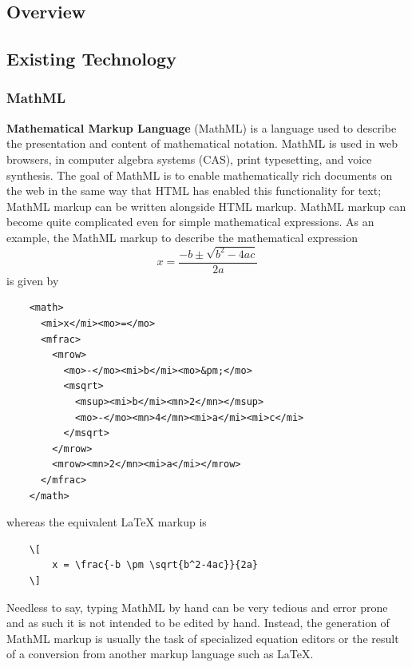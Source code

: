 \documentclass[11pt]{article}
\begin{document}
\subsection{Overview}

\subsection{Existing Technology}

\subsubsection{MathML}
\textbf{Mathematical Markup Language} (MathML) is a language used to describe the presentation and content of mathematical notation.  MathML is used in web browsers, in computer algebra systems (CAS), print typesetting, and voice synthesis.  The goal of MathML is to enable mathematically rich documents on the web in the same way that HTML has enabled this functionality for text; MathML markup can be written alongside HTML markup.  MathML markup can become quite complicated even for simple mathematical expressions.  As an example, the MathML markup to describe the mathematical expression
\[
x = \frac{-b \pm\sqrt{b^2-4ac}}{2a}
\]
is given by
\begin{verbatim}
    <math>
      <mi>x</mi><mo>=</mo>
      <mfrac>
        <mrow>
          <mo>-</mo><mi>b</mi><mo>&pm;</mo>
          <msqrt>
            <msup><mi>b</mi><mn>2</mn></msup>
            <mo>-</mo><mn>4</mn><mi>a</mi><mi>c</mi>
          </msqrt>
        </mrow>
        <mrow><mn>2</mn><mi>a</mi></mrow>
      </mfrac>
    </math>
\end{verbatim}
whereas the equivalent LaTeX markup is
\begin{verbatim}
    \[
        x = \frac{-b \pm \sqrt{b^2-4ac}}{2a}
    \]
\end{verbatim}
Needless to say, typing MathML by hand can be very tedious and error prone and as such it is not intended to be edited by hand.  Instead, the generation of MathML markup is usually the task of specialized equation editors or the result of a conversion from another markup language such as LaTeX.
 
\end{document}
